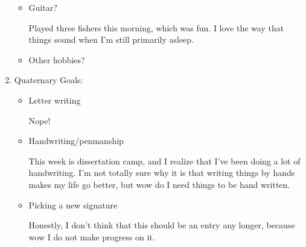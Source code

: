 \documentclass[12pt]{article}
\renewcommand{\,}{\textsuperscript{,}}
\begin{document}
\begin{enumerate}
\begin{itemize}
\item Guitar?

Played three fishers this morning, which was fun.  
I love the way that things sound when I'm still primarily asleep.

\item Other hobbies?

\end{itemize}

\item Quaternary Goals:

\begin{itemize}

\item Letter writing

Nope!

\item Handwriting/penmanship

This week is dissertation camp, and I realize that I've been doing a lot of handwriting.  
I'm not totally sure why it is that writing things by hands makes my life go better, but wow do I need things to be hand written.

\item Picking a new signature

Honestly, I don't think that this should be an entry any longer, because wow I do not make progress on it.

\end{itemize}

\end{enumerate}
\end{document}
